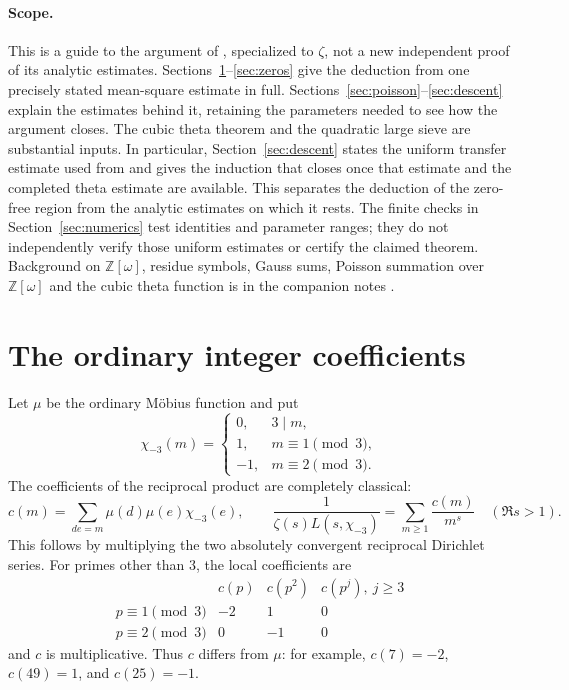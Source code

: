 \documentclass[11pt]{article}
\newcommand{\OO}{\mathbb Z[\omega]}
\newcommand{\ch}{\chi_{-3}}
\numberwithin{equation}{section}
\begin{document}
\paragraph{Scope.}
This is a guide to the argument of \cite{original}, specialized to $\zeta$, not a new
independent proof of its analytic estimates. Sections~\ref{sec:coefficients}--\ref{sec:zeros}
give the deduction from one precisely stated mean-square estimate in full.
Sections~\ref{sec:poisson}--\ref{sec:descent} explain the estimates behind it,
retaining the parameters needed to see how the argument closes. The cubic
theta theorem and the quadratic large sieve are substantial inputs.
In particular, Section~\ref{sec:descent} states the uniform transfer
estimate used from \cite{original} and gives the induction that closes
once that estimate and the completed theta estimate are available.
This separates the deduction of the zero-free region from the analytic
estimates on which it rests. The finite checks in Section~\ref{sec:numerics}
test identities and parameter ranges; they do not independently verify
those uniform estimates or certify the claimed theorem.
Background on $\OO$, residue symbols, Gauss sums, Poisson summation over $\OO$
and the cubic theta function is in the companion notes \cite{QF}.

\section{The ordinary integer coefficients}\label{sec:coefficients}

Let $\mu$ be the ordinary M\"obius function and put
\begin{equation}\label{eq:chi3def}
 \ch(m)=\begin{cases}0,&3\mid m,\\1,&m\equiv1\pmod3,\\-1,&m\equiv2\pmod3.\end{cases}
\end{equation}
The coefficients of the reciprocal product are completely classical:
\begin{equation}\label{eq:cm}
 c(m)=\sum_{de=m}\mu(d)\mu(e)\ch(e),\qquad
 \frac1{\zeta(s)L(s,\ch)}=\sum_{m\ge1}\frac{c(m)}{m^s}\quad(\Re s>1).
\end{equation}
This follows by multiplying the two absolutely convergent reciprocal
Dirichlet series. For primes other than $3$, the local coefficients are
\begin{equation}\label{eq:localc}
\begin{array}{c|ccc}
 &c(p)&c(p^2)&c(p^j),\ j\ge3\\\hline
 p\equiv1\pmod3&-2&1&0\\
 p\equiv2\pmod3&0&-1&0
\end{array}
\end{equation}
and $c$ is multiplicative. Thus $c$ differs from $\mu$: for example,
$c(7)=-2$, $c(49)=1$, and $c(25)=-1$.
\end{document}
